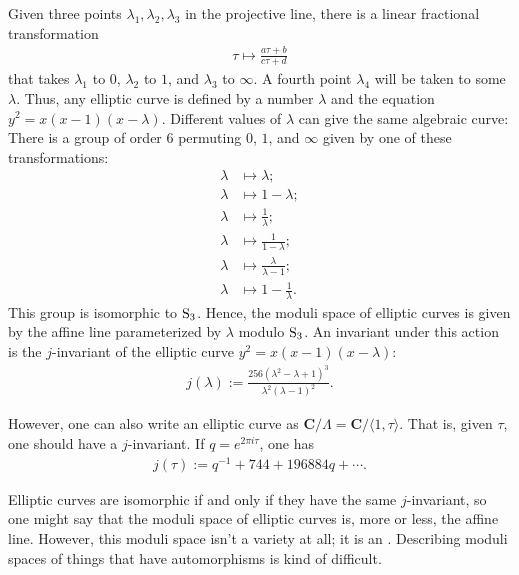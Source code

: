 \documentclass [11 pt, oneside] {article}
\begin{document}
Given three points $\lambda_1,\lambda_2,\lambda_3$ in the projective line, there is a linear fractional transformation 
\begin{align*}
	\tau\longmapsto \frac{a\tau+b}{c\tau+d}
\end{align*}
that takes $\lambda_1$ to $0$, $\lambda_2$ to $1$, and $\lambda_3$ to $\infty$. A fourth point $\lambda_4$ will be taken to some $\lambda$. Thus, any elliptic curve is defined by a number $\lambda$ and the equation $y^2=x(x-1) (x-\lambda)$. Different values of $\lambda$ can give the same algebraic curve: There is a group of order $6$ permuting $0$, $1$, and $\infty$ given by one of these transformations:
\begin{align*}
	\lambda&\longmapsto\lambda;\\
	\lambda&\longmapsto 1-\lambda;\\
	\lambda&\longmapsto\frac{1}{\lambda};\\
	\lambda&\longmapsto \frac{1}{1-\lambda};\\
	\lambda&\longmapsto \frac{\lambda}{\lambda-1};\\
	\lambda&\longmapsto 1-\frac{1}{\lambda}.
\end{align*}
This group is isomorphic to $\operatorname{S}_3$. Hence, the moduli space of elliptic curves is given by the affine line parameterized by $\lambda$ modulo $\operatorname{S}_3$. An invariant under this action is the $j$-invariant of the elliptic curve $y^2 = x(x-1) (x-\lambda)$:
\begin{align*}
	j(\lambda) := \frac{256(\lambda^2-\lambda+1)^3}{\lambda^2(\lambda-1)^2}.
\end{align*}

However, one can also write an elliptic curve as $\mathbf{C}/\Lambda=\mathbf{C}/\langle 1,\tau\rangle$. That is, given $\tau$, one should have a $j$-invariant. If $q=e^{2\pi i\tau}$, one has
\begin{align*}
	j(\tau) := q ^{-1} + 744 + 196884q + \cdots.
\end{align*}

Elliptic curves are isomorphic if and only if they have the same $j$-invariant, so one might say that the moduli space of elliptic curves is, more or less, the affine line. However, this moduli space isn't a variety at all; it is an . Describing moduli spaces of things that have automorphisms is kind of difficult.
\end{document}
